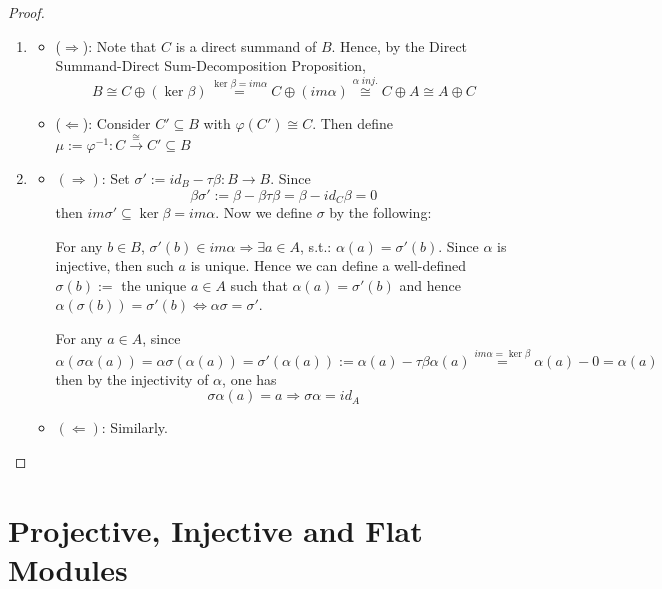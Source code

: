 \begin{proof}
    \begin{enumerate}
        \item \begin{itemize}
            \item ($\Rightarrow$): Note that $C$ is a direct summand of $B$. Hence, by the Direct Summand-Direct Sum-Decomposition Proposition,
            $$B \cong C \oplus (\ker \beta) \overset{\ker \beta =im \alpha}{=} C \oplus ( im\alpha) \overset{\alpha\;inj.}{\cong} C \oplus A \cong A \oplus C$$
            
            \item ($\Leftarrow$): Consider $C' \subseteq B$ with $\varphi (C') \cong C$. Then define $\mu:= \varphi ^{-1} :C \overset{\cong}{\to} C' \subseteq B$
        \end{itemize}
        \item \begin{itemize}
            \item $(\Rightarrow)$: Set $\sigma' := id_B -\tau \beta :B \to B$. Since
            $$\beta \sigma' := \beta- \beta \tau \beta = \beta -id_C\beta =0$$
            then $im\sigma' \subseteq \ker \beta =im\alpha$. Now we define $\sigma$ by the following:

            \noindent For any $b \in B$, $\sigma' (b) \in im \alpha \Rightarrow \exists a \in A$, s.t.: $\alpha(a) =\sigma' (b)$. Since $\alpha$ is injective, then such $a$ is unique. Hence we can define a well-defined $\sigma (b) :=$ the unique $a \in A$ such that $\alpha (a) =\sigma' (b)$ and hence $\alpha (\sigma(b)) = \sigma '(b) \Leftrightarrow \alpha \sigma =\sigma'$.

            \noindent For any $a \in A$, since
            $$\alpha (\sigma \alpha(a)) = \alpha\sigma (\alpha(a)) =\sigma' (\alpha(a)) := \alpha (a) - \tau\beta \alpha(a) \overset{im\alpha =\ker \beta}{=} \alpha(a) -0 =\alpha(a)$$
            then by the injectivity of $\alpha$, one has
            $$\sigma\alpha(a) =a \Rightarrow \sigma \alpha=id_A$$

            \item $(\Leftarrow)$: Similarly.
        \end{itemize}
    \end{enumerate}
\end{proof}


\section{Projective, Injective and Flat Modules}

